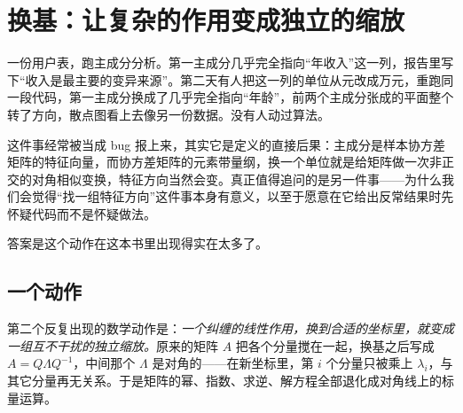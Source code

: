 \section{换基：让复杂的作用变成独立的缩放}
\label{sec:18-Synthesis/02-Recurring-Ideas/02}

一份用户表，跑主成分分析。第一主成分几乎完全指向``年收入''这一列，报告里写下``收入是最主要的变异来源''。第二天有人把这一列的单位从元改成万元，重跑同一段代码，第一主成分换成了几乎完全指向``年龄''，前两个主成分张成的平面整个转了方向，散点图看上去像另一份数据。没有人动过算法。

这件事经常被当成 bug 报上来，其实它是定义的直接后果：主成分是样本协方差矩阵的特征向量，而协方差矩阵的元素带量纲，换一个单位就是给矩阵做一次非正交的对角相似变换，特征方向当然会变。真正值得追问的是另一件事——为什么我们会觉得``找一组特征方向''这件事本身有意义，以至于愿意在它给出反常结果时先怀疑代码而不是怀疑做法。

答案是这个动作在这本书里出现得实在太多了。

\subsection{一个动作}

第二个反复出现的数学动作是：\emph{一个纠缠的线性作用，换到合适的坐标里，就变成一组互不干扰的独立缩放。}原来的矩阵 \(A\) 把各个分量搅在一起，换基之后写成 \(A = Q\Lambda Q^{-1}\)，中间那个 \(\Lambda\) 是对角的——在新坐标里，第 \(i\) 个分量只被乘上 \(\lambda_i\)，与其它分量再无关系。于是矩阵的幂、指数、求逆、解方程全部退化成对角线上的标量运算。

